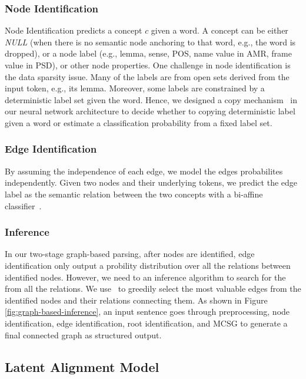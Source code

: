 \subsubsection{Node Identification}
\label{sssec:lex-phr:node-ident}
Node Identification predicts a concept $c$ given a word. A
concept can be either {\it NULL} (when there is no semantic node
anchoring to that word, e.g., the word is dropped), or a node label
(e.g., lemma, sense, POS, name value in AMR, frame value in PSD), or
other node properties. One challenge in node identification is the
data sparsity issue. Many of the labels are from open sets derived
from the input token, e.g., its lemma.  Moreover, some labels are
constrained by a deterministic label set given the word. Hence, we
designed a copy mechanism~\citep{luong2014addressing} in our neural
network architecture to decide whether to copying deterministic label
given a word or estimate a classification probability from a fixed
label set.


\subsubsection{Edge Identification}
\label{sssec:lex-phr:edge-ident}

By assuming the independence of each edge, we model the edges
probabilites independently.  Given two nodes and their underlying
tokens, we predict the edge label as the semantic relation between the
two concepts with a bi-affine classifier~\cite{dozat2016deep}.

\subsubsection{Inference}
\label{sssec:lex-phr:inference}
In our two-stage graph-based parsing, after nodes are identified, edge
identification only output a probility distribution over all the
relations between identified nodes. However, we need to an inference
algorithm to search for the  from all
the relations. We use~\citet[MSCG,][]{Flanigan:2014vc} to greedily
select the most valuable edges from the identified nodes and their
relations connecting them. As shown in Figure
\ref{fig:graph-based-inference}, an input sentence goes through
preprocessing, node identification, edge identification, root
identification, and MCSG to generate a final connected graph as
structured output.

\subsection{Latent Alignment Model}
\label{ssec:lex-phr:latent-alignment}

